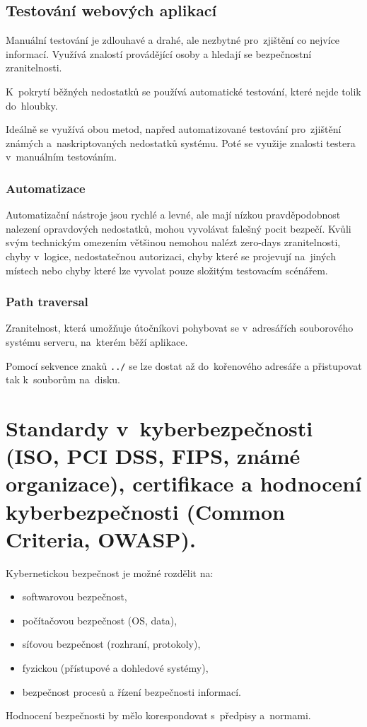 \subsection{Testování webových aplikací}

Manuální testování je zdlouhavé a drahé, ale nezbytné pro~zjištění co nejvíce informací.
Využívá znalostí provádějící osoby a hledají se bezpečnostní zranitelnosti.

K~pokrytí běžných nedostatků se používá automatické testování, které nejde tolik do~hloubky.

Ideálně se využívá obou metod, napřed automatizované testování pro~zjištění známých a~naskriptovaných nedostatků systému.
Poté se využije znalosti testera v~manuálním testováním.

\subsubsection{Automatizace}

Automatizační nástroje jsou rychlé a levné, ale mají nízkou pravděpodobnost nalezení opravdových nedostatků, mohou vyvolávat falešný pocit bezpečí.
Kvůli svým technickým omezením většinou nemohou nalézt
zero-days zranitelnosti,
chyby v~logice,
nedostatečnou autorizaci,
chyby které se projevují na~jiných místech nebo
chyby které lze vyvolat pouze složitým testovacím scénářem.

\subsubsection{Path traversal}

Zranitelnost, která umožňuje útočníkovi pohybovat se v~adresářích souborového systému serveru, na~kterém běží aplikace.

Pomocí sekvence znaků \texttt{../} se lze dostat až do~kořenového adresáře a přistupovat tak k~souborům na~disku.


\clearpage
\section{Standardy v~kyberbezpečnosti (ISO, PCI DSS, FIPS, známé organizace), certifikace a hodnocení kyberbezpečnosti (Common Criteria, OWASP).}

Kybernetickou bezpečnost je možné rozdělit na:
\vspace*{-1em}\begin{itemize}
\item softwarovou bezpečnost,
\item počítačovou bezpečnost (OS, data),
\item síťovou bezpečnost (rozhraní, protokoly),
\item fyzickou (přístupové a dohledové systémy),
\item bezpečnost procesů a řízení bezpečnosti informací.
\end{itemize}
Hodnocení bezpečnosti by mělo korespondovat s~předpisy a~normami.

